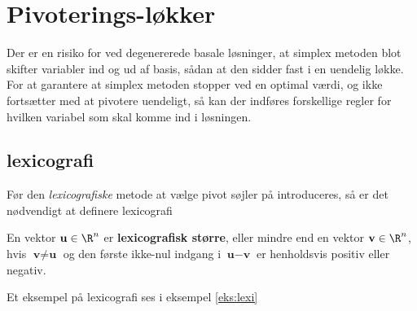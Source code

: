 \section{Pivoterings-løkker}
 Der er en risiko for ved degenererede basale løsninger, at simplex metoden blot skifter variabler ind og ud af basis, sådan at den sidder fast i en uendelig løkke.  
For at garantere at simplex metoden stopper ved en optimal værdi, og ikke fortsætter med at pivotere uendeligt, så kan der indføres forskellige regler for hvilken variabel som skal komme ind i løsningen.

\subsection{lexicografi}

Før den \textit{lexicografiske} metode at vælge pivot søjler på introduceres, så er det nødvendigt at definere lexicografi
\begin{defn}{}{}
En vektor $\textbf{u}\in \R^n$ er \textbf{lexicografisk større}, eller mindre end en vektor $\textbf{v}\in \R^n$, hvis $\textbf{v} \neq \textbf{u}$ og den første ikke-nul indgang i $\textbf{u}-\textbf{v}$ er henholdsvis positiv eller negativ.
\end{defn}
\noindent
Et eksempel på lexicografi ses i eksempel \ref{eks:lexi}

